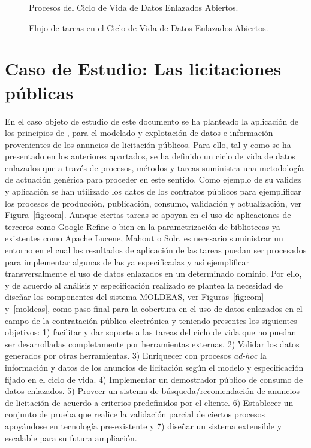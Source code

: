 \documentclass[a4paper,final,11pt,fleqn,twoside]{book}  %
\begin{document}
\begin{figure}[htb]
\centering
\caption{Procesos del Ciclo de Vida de Datos Enlazados Abiertos.}\label{lld}
\end{figure}

\begin{figure}[htb]
\centering
\caption{Flujo de tareas en el Ciclo de Vida de Datos Enlazados Abiertos.}\label{tareas}
\end{figure}

\section{Caso de Estudio: Las licitaciones públicas}
En el caso objeto de estudio de este documento se ha planteado la aplicación de los principios 
de \linkeddata, para el modelado y explotación de datos e información provenientes de los anuncios de 
licitación públicos. Para ello, tal y como se ha presentado en los anteriores apartados, se ha definido 
un ciclo de vida de datos enlazados que a través de procesos, métodos y tareas suministra una metodología 
de actuación genérica para proceder en este sentido. Como ejemplo de su validez y aplicación se han utilizado 
los datos de los contratos públicos para ejemplificar los procesos de producción, publicación, consumo, validación y 
actualización, ver Figura~\ref{fig:com}. Aunque ciertas tareas se apoyan en el uso de aplicaciones de terceros como Google Refine o bien 
en la parametrización de bibliotecas ya existentes como Apache Lucene, Mahout o Solr, es necesario suministrar un entorno 
en el cual los resultados de aplicación de las tareas puedan ser procesados para implementar algunas de las ya 
especificadas y así ejemplificar transversalmente el uso de datos enlazados en un determinado dominio. Por ello, y 
de acuerdo al análisis y especificación realizado se plantea la necesidad de diseñar los componentes del sistema 
MOLDEAS, ver Figuras~\ref{fig:com} y~\ref{moldeas}, como paso final para la cobertura en el uso de datos enlazados en el campo de la contratación pública 
electrónica y teniendo presentes los siguientes objetivos: 1) facilitar y dar soporte a las tareas del ciclo de vida que no puedan ser desarrolladas completamente 
por herramientas externas. 2)  Validar los datos generados por otras herramientas. 3) Enriquecer con procesos \textit{ad-hoc} la información y datos de los anuncios de licitación según el modelo 
y especificación fijado en el ciclo de vida. 4) Implementar un demostrador público de consumo de datos enlazados. 
5) Proveer un sistema de búsqueda/recomendación de anuncios de licitación de acuerdo a criterios predefinidos por el cliente. 6) Establecer un conjunto de prueba que realice la validación parcial de ciertos procesos apoyándose en tecnología 
pre-existente y 7) diseñar un sistema extensible y escalable para su futura ampliación.
\end{document}
